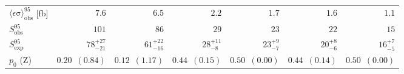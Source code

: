 \begin{table}[tbp]
\begin{center}
\begin{tabular}{|lrrrrrr|}
$\langle\epsilon\mathrm{ \sigma}\rangle_\mathrm{ obs}^{95}$ [fb]   &$7.6$  & $6.5$  & $2.2$  & $1.7$ & $1.6$ & $1.1$ \\
$S_\mathrm{ obs}^{95}$     & $101$ & $86$ & $29$ &  $23$ & $22$ & $15$ \\
$S_\mathrm{ exp}^{95}$     & $ { 78 }^{ +27 }_{ -21 }$ & $ { 61 }^{ +22 }_{ -16 }$ & $ { 28 }^{ +11 }_{ -8 }$ & $ { 23}^{ +9}_{ -7 }$ & $ { 20 }^{ +8 }_{ -6 }$ & $ { 16 }^{ +7 }_{ -5 }$  \\
$p_{0}$ ($\mathrm{Z}$)        & $ 0.20$~$(0.84)$ & $ 0.12$~$(1.17)$ & $ 0.44$~$(0.15)$& $ 0.50$~$(0.00)$ &  $ 0.44$~$(0.14)$ &  $ 0.50$~$(0.00)$ \\
\hline
\end{tabular}




\end{center}
\end{table}
